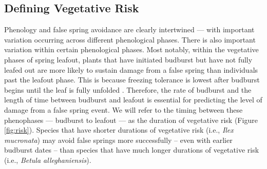 \documentclass{article}\usepackage[]{graphicx}\usepackage[]{color}
\begin{document}
\subsection* {Defining Vegetative Risk} %
Phenology and false spring avoidance are clearly intertwined --- with important variation occurring across different phenological phases. %
There is also important variation within certain phenological phases. Most notably, within the vegetative phases of spring leafout, plants that have initiated budburst but have not fully leafed out are more likely to sustain damage from a false spring than individuals past the leafout phase. This is because freezing tolerance is lowest after budburst begins until the leaf is fully unfolded \citep{Lenz2016}. Therefore, the rate of budburst and the length of time between budburst and leafout is essential for predicting the level of damage from a false spring event. We will refer to the timing between these phenophases --- budburst to leafout --- as the duration of vegetative risk (Figure \ref{fig:risk}). Species that have shorter durations of vegetative risk (i.e., \textit{Ilex mucronata}) may avoid false springs more successfully -- even with earlier budburst dates -- than species that have much longer durations of vegetative risk (i.e., \textit{Betula alleghaniensis}).
\end{document}
